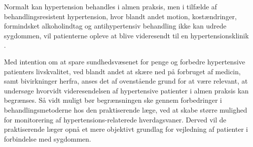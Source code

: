 Normalt kan hypertension behandles i almen praksis, men i tilfælde af behandlingsresistent hypertension, hvor blandt andet motion, kostændringer, formindsket alkoholindtag og antihypertensiv behandling ikke kan udrede sygdommen, vil patienterne opleve at blive videresendt til en hypertensionsklinik \cite{lodberg2016, bech2015}.

Med intention om at spare sundhedsvæsenet for penge og forbedre hypertensive patienters livskvalitet, ved blandt andet at skære ned på forbruget af medicin, samt bivirkninger herfra, anses det af ovenstående grund for at være relevant, at undersøge hvorvidt videresendelsen af hypertensive patienter i almen praksis kan begrænses. Så vidt muligt bør begrænsningen ske gennem forbedringer i behandlingsmetoderne hos den praktiserende læge, ved at skabe større mulighed for monitorering af hypertensions-relaterede hverdagsvaner. Derved vil de praktiserende læger opnå et mere objektivt grundlag for vejledning af patienter i forbindelse med sygdommen.